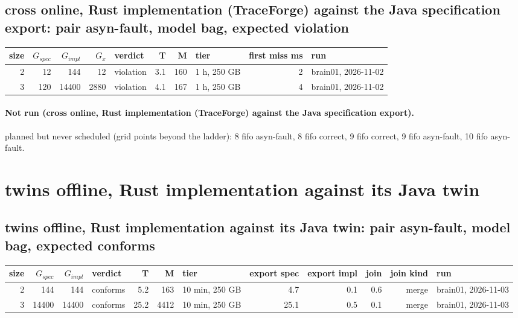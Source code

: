 \documentclass[10pt]{article}
\begin{document}
\subsection*{cross online, Rust implementation (TraceForge) against the Java specification export: pair \textsf{asyn-fault}, model bag, expected violation}
\begin{longtable}{@{}rrrrlrrlrl@{}}
\toprule
size & $G_{\mathit{spec}}$ & $G_{\mathit{impl}}$ & $G_x$ & verdict & T & M & tier & first miss ms & run \\
\midrule
\endhead
\color{red} 2 & 12 & 144 & 12 & violation & 3.1 & 160 & 1 h, 250 GB & 2 & brain01, 2026-11-02 \\
\color{red} 3 & 120 & 14400 & 2880 & violation & 4.1 & 167 & 1 h, 250 GB & 4 & brain01, 2026-11-02 \\
\bottomrule
\end{longtable}
\paragraph{Not run (cross online, Rust implementation (TraceForge) against the Java specification export).}
planned but never scheduled (grid points beyond the ladder): 8 fifo asyn-fault, 8 fifo correct, 9 fifo correct, 9 fifo asyn-fault, 10 fifo asyn-fault.\par
\section*{twins offline, Rust implementation against its Java twin}
\subsection*{twins offline, Rust implementation against its Java twin: pair \textsf{asyn-fault}, model bag, expected conforms}
\begin{longtable}{@{}rrrlrrlrrrrl@{}}
\toprule
size & $G_{\mathit{spec}}$ & $G_{\mathit{impl}}$ & verdict & T & M & tier & export spec & export impl & join & join kind & run \\
\midrule
\endhead
\color{blue} 2 & 144 & 144 & conforms & 5.2 & 163 & 10 min, 250 GB & 4.7 & 0.1 & 0.6 & merge & brain01, 2026-11-03 \\
\color{blue} 3 & 14400 & 14400 & conforms & 25.2 & 4412 & 10 min, 250 GB & 25.1 & 0.5 & 0.1 & merge & brain01, 2026-11-03 \\
\bottomrule
\end{longtable}
\end{document}
